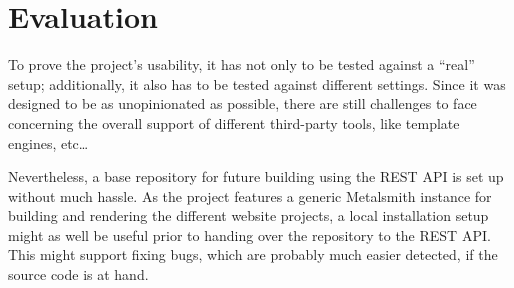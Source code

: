 \chapter{Evaluation}
\label{cha:evaluation}

To prove the project's usability, it has not only to be tested against a ``real'' setup; additionally, it also has to be tested against different settings. Since it was designed to be as unopinionated as possible, there are still challenges to face concerning the overall support of different third-party tools, like template engines, etc\ldots

Nevertheless, a base repository for future building using the REST API is set up without much hassle. As the project features a generic Metalsmith instance for building and rendering the different website projects, a local installation setup might as well be useful prior to handing over the repository to the REST API. This might support fixing bugs, which are probably much easier detected, if the source code is at hand.





